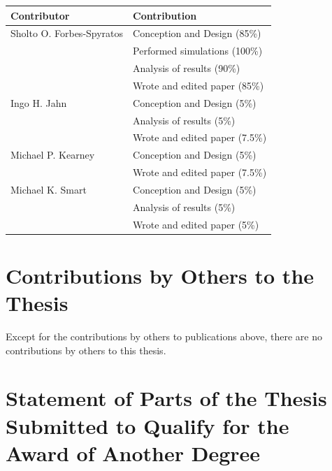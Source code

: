 \begin{center}
  \begin{tabular}{ll}
    \toprule
    Contributor   & Contribution \\
    \midrule
    Sholto O. Forbes-Spyratos             
                                  & Conception and Design (85\%)\\
                                  & Performed simulations (100\%)\\
                                  & Analysis of results (90\%)\\
                                  & Wrote and edited paper (85\%)\\
    \midrule
    Ingo H. Jahn            
                                  & Conception and Design (5\%)\\
                                  & Analysis of results (5\%)\\
                                  & Wrote and edited paper (7.5\%)\\
                                  
        \midrule
        Michael P. Kearney            
								      & Conception and Design (5\%)\\
								      & Wrote and edited paper (7.5\%)\\                       

    \midrule
    Michael K. Smart              
                                  & Conception and Design (5\%)\\
                                  & Analysis of results (5\%)\\
                                  & Wrote and edited paper (5\%)\\
    \bottomrule
  \end{tabular}
\end{center}



\section*{Contributions by Others to the Thesis}

Except for the contributions by others to publications above, there are no contributions by others to this thesis.

\section*{Statement of Parts of the Thesis Submitted to Qualify for the Award of Another Degree}

